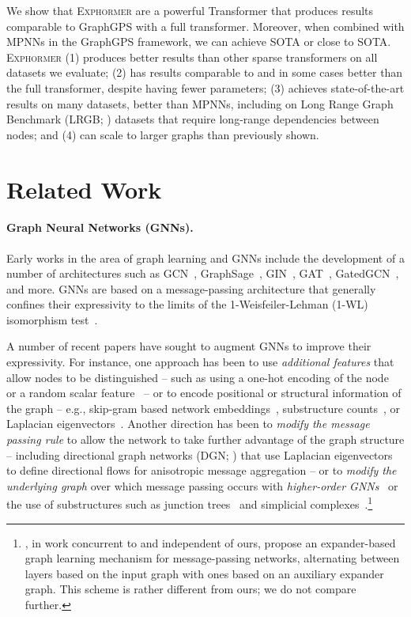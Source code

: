 \documentclass{article}
\theoremstyle{plain}
\theoremstyle{definition}
\theoremstyle{remark}
\let\mytodo\todo
\begin{document}
We show that \textsc{Exphormer} are a powerful Transformer that produces results comparable to  GraphGPS with a full transformer.  Moreover, when combined with MPNNs in the GraphGPS framework, we can achieve SOTA or close to SOTA.
\textsc{Exphormer}
(1) produces better results than other sparse transformers on all datasets we evaluate; 
(2) has results comparable to and in some cases better than the full transformer, despite having fewer parameters;
(3) achieves state-of-the-art results on many datasets, better than MPNNs, including on Long Range Graph Benchmark (LRGB; \citealp{lrgb-2022}) datasets that require long-range dependencies between nodes;
and (4) can scale to larger graphs than previously shown.\mytodo{CIFAR10, MNIST, and PATTERN}


\section{Related Work}
\paragraph{Graph Neural Networks (GNNs).} Early works in the area of graph learning and GNNs include the development of a number of architectures such as GCN~\citep{defferrard2016convolutional, kipf2017semi}, GraphSage~\citep{hamilton2017inductive}, GIN~\citep{xu2018powerful}, GAT~\citep{velickovic2018graph}, GatedGCN~\citep{bresson2017residual}, and more. GNNs are based on a message-passing architecture that generally confines their expressivity to the limits of the  1-Weisfeiler-Lehman (1-WL) isomorphism test~\citep{xu2018powerful}.

A number of recent papers have sought to augment GNNs to improve their expressivity. For instance, one approach has been to use \emph{additional features} that allow nodes to be distinguished -- such as using a {one-hot encoding} of the node~\citep{murphy2019relational} or a {random} scalar feature~\citep{sato2021random} -- or to encode positional or structural information of the graph -- e.g., skip-gram based network embeddings~\citep{qiu2018network}, substructure counts~\citep{bouritsas2020improving}, or Laplacian eigenvectors~\citep{dwivedi2021graph}. Another direction has been to \emph{modify the message passing rule} to allow the network to take further advantage of the graph structure -- including directional graph networks (DGN; \citealp{beaini2021directional}) that use Laplacian eigenvectors to define {directional flows} for anisotropic message aggregation -- or to \emph{modify the underlying graph} over which message passing occurs with \emph{higher-order GNNs}~\citep{morris2019weisfeiler} or the use of substructures such as junction trees~\citep{fey2020hierarchical} and simplicial complexes~\citep{bodnar2021weisfeiler}.\footnote{\citet{expander-graph-prop}, in work concurrent to and independent of ours, propose an expander-based graph learning mechanism for message-passing networks, alternating between layers based on the input graph with ones based on an auxiliary expander graph. This scheme is rather different from ours; we do not compare further.}
\end{document}
